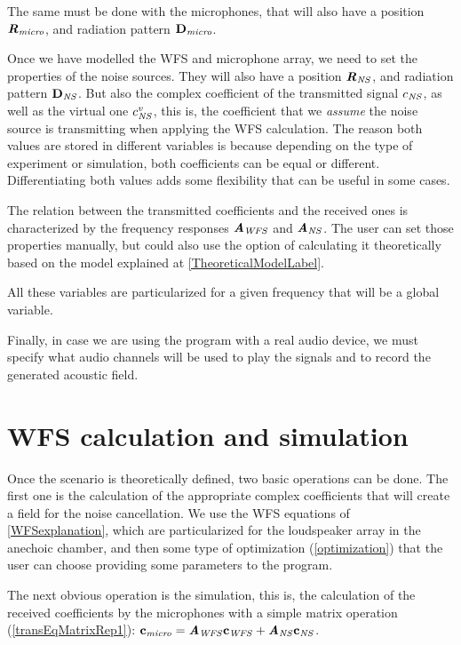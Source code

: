 The same must be done with the microphones, that will also have a position $\Pos[mat][micro]$, and radiation pattern $\Diag[vec][micro]$.

Once we have modelled the WFS and microphone array, we need to set the properties of the noise sources. They will also have a position $\Pos[mat][NS]$, and radiation pattern $\Diag[vec][NS]$. But also the complex coefficient of the transmitted signal $\coef[scalar][NS]$, as well as the virtual one $\coef[scalar][NS]<virtual>$, this is, the coefficient that we \textit{assume} the noise source is transmitting when applying the WFS calculation. The reason both values are stored in different variables is because depending on the type of experiment or simulation, both coefficients can be equal or different. Differentiating both values adds some flexibility that can be useful in some cases.

The relation between the transmitted coefficients and the received ones is characterized by the frequency responses $\AcPath[mat][WFS]$ and $\AcPath[mat][NS]$. The user can set those properties manually, but could also use the option of calculating it theoretically based on the model explained at \autoref{TheoreticalModelLabel}.

All these variables are particularized for a given frequency that will be a global variable.

Finally, in case we are using the program with a real audio device, we must specify what audio channels will be used to play the signals and to record the generated acoustic field.
 
\section{WFS calculation and simulation}
\label{WFScalculation}

Once the scenario is theoretically defined, two basic operations can be done. The first one is the calculation of the appropriate complex coefficients that will create a field for the noise cancellation. We use the WFS equations of \autoref{WFSexplanation}, which are particularized for the loudspeaker array in the anechoic chamber, and then some type of optimization (\autoref{optimization}) that the user can choose providing some parameters to the program.

The next obvious operation is the simulation, this is, the calculation of the received coefficients by the microphones with a simple matrix operation (\autoref{transEqMatrixRep1}): $\coef[vec][micro] = \AcPath[mat][WFS] \coef[vec][WFS] + \AcPath[mat][NS] \coef[vec][NS]$.

